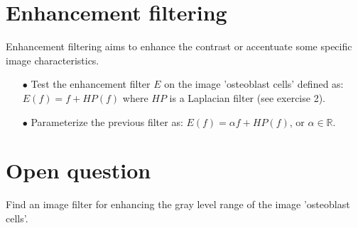 \section{Enhancement filtering}
Enhancement filtering aims to enhance the contrast or accentuate some specific image characteristics.
\begin{itemize}
	\item[$\bullet$] Test the enhancement filter $E$ on the image 'osteoblast cells' defined as:
	$E(f)=f+HP(f)$ where $HP$ is a Laplacian filter (see exercise 2).
	\item[$\bullet$] Parameterize the previous filter as:
	$E(f)=\alpha f+HP(f)$, or $\alpha\in\mathbb{R}$.
\end{itemize}

\section{Open question}
Find an image filter for enhancing the gray level range of the image 'osteoblast cells'.


